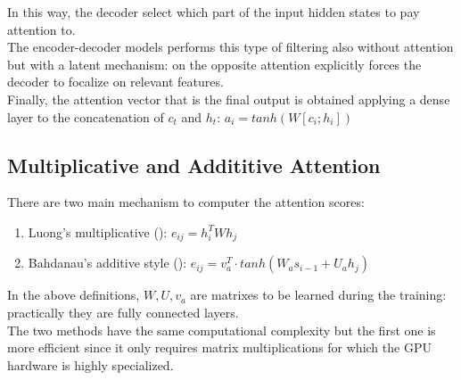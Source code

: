 \documentclass[LaM,binding=0.6cm]{sapthesis}
\begin{document}
In this way, the decoder select which part of the input hidden states to pay attention to.\\The encoder-decoder models performs this type of filtering also without attention but with a latent mechanism: on the opposite attention explicitly forces the decoder to focalize on relevant features.\\Finally, the attention vector that is the final output is obtained applying a dense layer to the concatenation of $c_t$ and $h_t$: $a_i=tanh(W[c_i;h_i])$
\subsection{Multiplicative and Addititive Attention}
There are two main mechanism to computer the attention scores:
\begin{enumerate}
\item Luong's multiplicative (\cite{luong}): $e_{ij} = h_{i}^{T}Wh_{j}$
\item Bahdanau's additive style (\cite{psy}): $e_{ij} = v_{a}^{T} \cdot tanh(W_{a}s_{i-1} + U_{a}h_j)$
\end{enumerate}
In the above definitions, $W,U,v_a$ are matrixes to be learned during the training: practically they are fully connected layers.\\The two methods have the same computational complexity but the first one is more efficient since it only requires matrix multiplications for which the GPU hardware is highly specialized.
\end{document}
